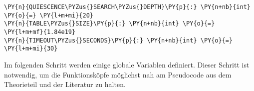 \bigskip

    \begin{tcolorbox}[fontupper=\linespread{.66}\selectfont, breakable, size=fbox, boxrule=1pt, pad at break*=1mm,colback=cellbackground, colframe=cellborder]
\begin{Verbatim}[commandchars=\\\{\}]
\PY{n}{QUIESCENCE\PYZus{}SEARCH\PYZus{}DEPTH}\PY{p}{:} \PY{n+nb}{int} \PY{o}{=} \PY{l+m+mi}{20}
\PY{n}{TABLE\PYZus{}SIZE}\PY{p}{:} \PY{n+nb}{int} \PY{o}{=} \PY{l+m+mf}{1.84e19}
\PY{n}{TIMEOUT\PYZus{}SECONDS}\PY{p}{:} \PY{n+nb}{int} \PY{o}{=} \PY{l+m+mi}{30}
\end{Verbatim}
\end{tcolorbox}

    Im folgenden Schritt werden einige globale Variablen definiert. Dieser
Schritt ist notwendig, um die Funktionsköpfe möglichst nah am Pseudocode
aus dem Theorieteil und der Literatur zu halten.


